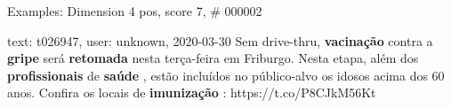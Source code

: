 \begin{frame}{Examples: Dimension 4 pos, score 7, \# 000002}
\footnotesize
\begin{exampleblock}{text: t026947, user: unknown, 2020-03-30}
Sem drive-thru, \textbf{vacinação} contra a \textbf{gripe} será 
\textbf{retomada} nesta terça-feira em Friburgo. Nesta etapa, além dos 
\textbf{profissionais} de \textbf{saúde} , estão incluídos no público-alvo os 
idosos acima dos 60 anos. Confira os locais de \textbf{imunização} : 
https://t.co/P8CJkM56Kt  
\end{exampleblock}
\end{frame}
